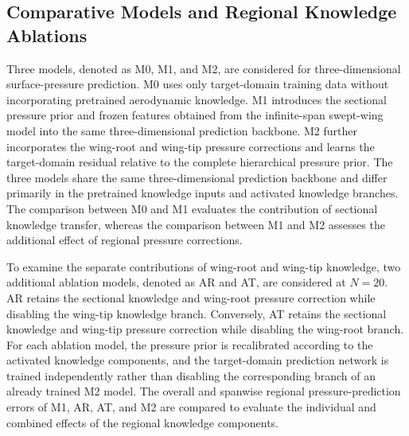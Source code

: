 
\subsection{Comparative Models and Regional Knowledge Ablations}
\label{subsec:comparative-models}

Three models, denoted as M0, M1, and M2, are considered for three-dimensional surface-pressure prediction. M0 uses only target-domain training data without incorporating pretrained aerodynamic knowledge. M1 introduces the sectional pressure prior and frozen features obtained from the infinite-span swept-wing model into the same three-dimensional prediction backbone. M2 further incorporates the wing-root and wing-tip pressure corrections and learns the target-domain residual relative to the complete hierarchical pressure prior. The three models share the same three-dimensional prediction backbone and differ primarily in the pretrained knowledge inputs and activated knowledge branches. The comparison between M0 and M1 evaluates the contribution of sectional knowledge transfer, whereas the comparison between M1 and M2 assesses the additional effect of regional pressure corrections.

To examine the separate contributions of wing-root and wing-tip knowledge, two additional ablation models, denoted as AR and AT, are considered at $N=20$. AR retains the sectional knowledge and wing-root pressure correction while disabling the wing-tip knowledge branch. Conversely, AT retains the sectional knowledge and wing-tip pressure correction while disabling the wing-root branch. For each ablation model, the pressure prior is recalibrated according to the activated knowledge components, and the target-domain prediction network is trained independently rather than disabling the corresponding branch of an already trained M2 model. The overall and spanwise regional pressure-prediction errors of M1, AR, AT, and M2 are compared to evaluate the individual and combined effects of the regional knowledge components.
